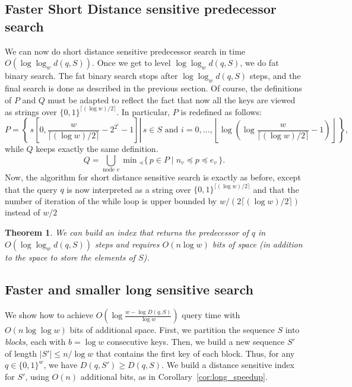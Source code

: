 \documentclass[a4paper,11pt]{article}
\newtheorem{theorem}{Theorem}[section]
\newcommand{\?}{\mskip1.5mu}
\begin{document}
\subsection{Faster Short Distance sensitive predecessor search}

We can now do short distance sensitive predecessor search 
in time $O(\log\log_w d(q, S))$. 
Once we get to level $\log\log_w d(q,S)$, we do fat 
binary search. The fat binary search stops after 
$\log\log_w d(q, S)$ steps, and the final search 
is done as described in the previous section. 
Of course, the definitions of $P$ and $Q$ must be adapted to 
reflect the fact that now all the keys are viewed as strings 
over $\{0, 1\}^{\lceil(\log w)/2\rceil}$. 
In particular, $P$ is redefined as follows:
\[
P = \left\{\,s\left[0,\frac{w}{\lceil(\log w)/2\rceil} - 2^{2^i} - 1\right] 
\left\vert \,s \in  S \text{ and }
	i=0,\dots,\left\lfloor\log\left(\log \frac{w}{\lceil(\log w)/2\rceil} - 1\right)
	\right\rfloor\,\right.\right\},
\]
while $Q$ keeps exactly the same definition. 
\[
Q=\bigcup_{\text{node $v$}}\min{}_\preceq\{\,p\in P\mid n_v\preceq p 
\preceq e_v\,\}.
\]
Now, the algorithm for short distance sensitive search is 
exactly as before, except that the query $q$ is now interpreted 
as a string over $\{0, 1\}^{\lceil(\log w)/2\rceil}$ and that the 
number of iteration of the while loop is upper bounded by 
$w/(2\lceil(\log w)/2\rceil)$ instead of $w/2$
\begin{theorem}
\label{thm:pred-short}
We can build an index that returns the predecessor of $q$
in $O\left(\log\log_w d(q,S)\right)$ steps
and requires $O(n \log w )$
bits of space (in addition to the space to store the elements of $S$).
\end{theorem}


\subsection{Faster and smaller long sensitive search}

We show how to achieve 
$O\left(\log\frac{w - \log D(q, S)}{\log w}\right)$ query 
time with $O(n\log\log w)$ bits of additional space. 
First, we partition the sequence $S$ into \emph{blocks},  
each with $b = \log w$ consecutive keys. Then, we build 
a new sequence $S'$ of length $|S'| \leq n/\log w$
that contains the first key of each block.
Thus, for any 
$q \in \{0, 1\}^w$, we have
$D(q, S')\geq D(q, S)$. 
We build a distance sensitive index for $S'$,
using $O(n)$ additional bits, as in Corollary~\ref{cor:long_speedup}. 
\end{document}
